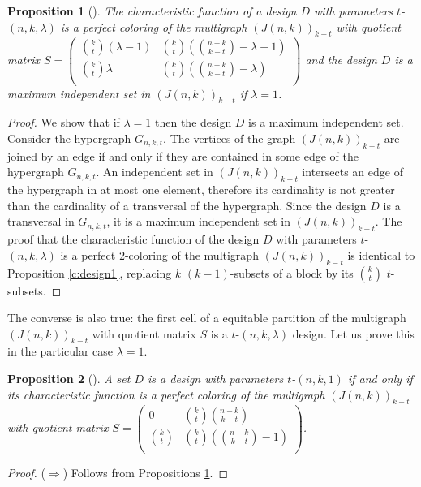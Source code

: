 \documentclass[11pt]{article}
\newtheorem{claim}{Proposition}[section]
\theoremstyle{definition}
\begin{document}
{{{\begin{claim}[\cite{PA20}]\label{c:design11}
The characteristic function of a design $D$ with parameters
$t$-$(n,k,\lambda)$ is a perfect coloring of the multigraph
$(J(n,k))_{k-t}$ with quotient matrix
 $S=\left(\begin{array}{cc}
{k\choose t}(\lambda-1)& {k\choose t}({{n-k}\choose{k-t}}-\lambda+1) \\
{k\choose t}\lambda&  {k\choose t}({{n-k}\choose{k-t}}-\lambda)\\
\end{array} \right)$
and the design $D$ is a maximum independent
set in $(J(n,k))_{k-t}$ if $\lambda=1$.
\end{claim}
\begin{proof}
We show that if $\lambda=1$ then the design $D$ is a maximum independent set.
Consider the hypergraph $G_{n,k,t}$. The vertices of the graph $(J(n,k))_{k-t}$
are joined by an edge if and only if they are contained in
some edge of the hypergraph $G_{n,k,t}$. An independent set
in $(J(n,k))_{k-t}$ intersects an edge of the hypergraph in at most
one element, therefore its cardinality is not greater than the cardinality of a
transversal of the hypergraph. Since the design $D$ is a transversal
in $G_{n,k,t}$, it is a maximum independent set in
$(J(n,k))_{k-t}$. The proof that the characteristic
function of the design $D$ with parameters $t$-$(n,k,\lambda)$ is a
perfect $2$-coloring of the multigraph $(J(n,k))_{k-t}$ is identical to Proposition \ref{c:design1}, replacing $k$ $(k-1)$-subsets of a block by its ${k \choose t}$ $t$-subsets.
\end{proof}

The converse is also true: the first cell of a equitable partition of the multigraph
$(J(n,k))_{k-t}$ with quotient matrix $S$ is a
$t$-$(n,k,\lambda)$ design. Let us prove this in the particular case
$\lambda=1$.

\begin{claim}[\cite{PA20}]\label{c:design19}
A set $D$ is a design with parameters $t$-$(n,k,1)$ if and
only if its characteristic function is a
perfect coloring of the multigraph $(J(n,k))_{k-t}$ with quotient
matrix $S=\left(\begin{array}{cc}
0 & {k\choose t}{{n-k}\choose{k-t}} \\
{k\choose t}&  {k\choose t}({{n-k}\choose{k-t}}-1)\\
\end{array} \right)$.
\end{claim}
\begin{proof}
($\Rightarrow$) Follows from Propositions 
\ref{c:design11}.


\end{proof}}}}
\end{document}
